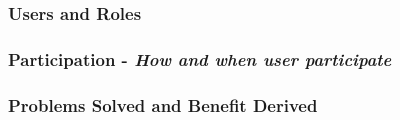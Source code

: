 \documentclass{sig-alternate}
\begin{document}
\subsubsection{Users and Roles}



\subsubsection{Participation - \emph{How and when user participate}}

\subsubsection{Problems Solved and Benefit Derived}
\end{document}
